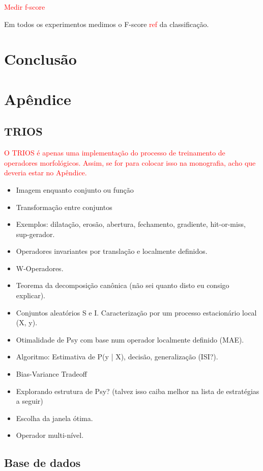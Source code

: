 \documentclass[a4paper,11pt]{article}
\newcommand{\TODO}[1]{\textcolor{red}{#1}}
\begin{document}
  \TODO{Medir f-score}

  Em todos os experimentos medimos o F-score \TODO{ref} da classificação.


\section{Conclusão}


\section{Apêndice}

\subsection{TRIOS}

\TODO{O TRIOS é apenas uma implementação do processo de treinamento de
  operadores morfológicos. Assim, se for para colocar isso na
  monografia, acho que deveria estar no Apêndice.}
      \begin{itemize}
        \item Imagem enquanto conjunto ou função
        \item Transformação entre conjuntos
        \item Exemplos: dilatação, erosão, abertura, fechamento, gradiente, hit-or-miss, sup-gerador.
        \item Operadores invariantes por translação e localmente definidos.
        \item W-Operadores.
        \item Teorema da decomposição canônica (não sei quanto disto eu consigo explicar).
        \item Conjuntos aleatórios S e I. Caracterização por um processo estacionário local (X, y).
        \item Otimalidade de Psy com base num operador localmente definido (MAE).
        \item Algoritmo: Estimativa de P(y | X), decisão, generalização (ISI?).
        \item Bias-Variance Tradeoff
        \item Explorando estrutura de Psy? (talvez isso caiba melhor na lista de estratégias a seguir)
        \item Escolha da janela ótima.
        \item Operador multi-nível.
      \end{itemize}

  \subsection{Base de dados}
\end{document}

